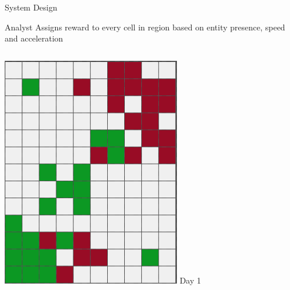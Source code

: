 \documentclass[9pt]{beamer}
\begin{document}
\begin{frame}{System Design}
    \begin{block}{Analyst}
        Assigns reward to every cell in region based on entity presence, speed and acceleration
    \end{block}
    \begin{columns}
    
        \begin{column}{0.33\textwidth}
            \begin{columns}
                \begin{column}{0.5\textwidth}
                    \begin{center}
                        \includegraphics[width=\textwidth,trim={0cm 0cm 0cm 0cm},clip]{img/analyst1.png}
                        \newline
                        Day 1
                        \newline

\end{center}
\end{column}
\end{columns}
\end{column}
\end{columns}
\end{frame}
\end{document}
